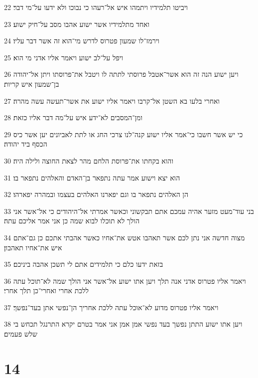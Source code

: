 \par 22 ויביטו תלמידיו ויתמהו איש אל־רעהו כי נבוכו ולא ידעו על־מי דבר׃
\par 23 ואחד מתלמידיו אשר ישוע אהבו מסב על־חיק ישוע׃
\par 24 וירמז־לו שמעון פטרוס לדרש מי־הוא זה אשר דבר עליו׃
\par 25 ויפל על־לב ישוע ויאמר אליו אדני מי הוא׃
\par 26 ויען ישוע הנה זה הוא אשר־אטבל פרוסתי לתתה לו ויטבל את־פרוסתו ויתן אל־יהודה בן־שמעון איש קריות׃
\par 27 ואחרי בלעו בא השטן אל־קרבו ויאמר אליו ישוע את אשר־תעשה עשה מהרה׃
\par 28 ומן־המסבים לא־ידע איש על־מה דבר אליו כזאת׃
\par 29 כי יש אשר חשבו כי־אמר אליו ישוע קנה־לנו צרכי החג או לתת לאביונים יען אשר כיס הכסף ביד יהודה׃
\par 30 והוא בקחתו את־פרוסת הלחם מהר לצאת החוצה ולילה היה׃
\par 31 הוא יצא וישוע אמר עתה נתפאר בן־האדם והאלהים נתפאר בו׃
\par 32 הן האלהים נתפאר בו וגם יפארנו האלהים בעצמו ובמהרה יפארהו׃
\par 33 בני עוד־מעט מזער אהיה עמכם אתם תבקשוני וכאשר אמרתי אל־היהודים כי אל־אשר אני הולך לא תוכלו לבוא שמה כן אני אמר אליכם עתה׃
\par 34 מצוה חדשה אני נתן לכם אשר תאהבו אטש את־אחיו כאשר אהבתי אתכם כן גם־אתם איש את־אחיו תאהבון׃
\par 35 בזאת ידעו כלם כי תלמידים אתם לי תשכן אהבה ביניכם׃
\par 36 ויאמר אליו פטרוס אדני אנה תלך ויען אתו ישוע אל־אשר אני הולך שמה לא־תוכל עתה ללכת אחרי ואחרי־כן תלך אחרי׃
\par 37 ויאמר אליו פטרוס מדוע לא־אוכל עתה ללכת אחריך הן־נפשי אתן בעד־נפשך׃
\par 38 ויען אתו ישוע התתן נפשך בעד נפשי אמן אמן אני אמר בטרם יקרא התרנגל תכחש בי שלש פעמים׃

\chapter{14}

